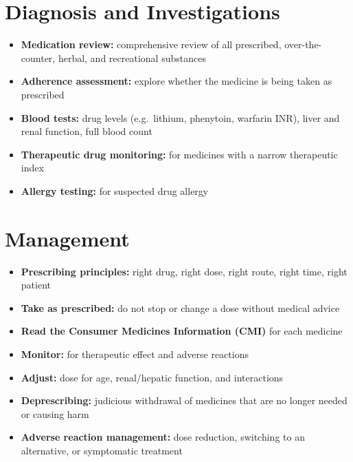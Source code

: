 \section*{Diagnosis and Investigations}
\begin{itemize}
    \item \textbf{Medication review:} comprehensive review of all prescribed, over-the-counter, herbal, and recreational substances
    \item \textbf{Adherence assessment:} explore whether the medicine is being taken as prescribed
    \item \textbf{Blood tests:} drug levels (e.g.\ lithium, phenytoin, warfarin INR), liver and renal function, full blood count
    \item \textbf{Therapeutic drug monitoring:} for medicines with a narrow therapeutic index
    \item \textbf{Allergy testing:} for suspected drug allergy
\end{itemize}

\section*{Management}
\begin{itemize}
    \item \textbf{Prescribing principles:} right drug, right dose, right route, right time, right patient
    \item \textbf{Take as prescribed:} do not stop or change a dose without medical advice
    \item \textbf{Read the Consumer Medicines Information (CMI)} for each medicine
    \item \textbf{Monitor:} for therapeutic effect and adverse reactions
    \item \textbf{Adjust:} dose for age, renal/hepatic function, and interactions
    \item \textbf{Deprescribing:} judicious withdrawal of medicines that are no longer needed or causing harm
    \item \textbf{Adverse reaction management:} dose reduction, switching to an alternative, or symptomatic treatment
\end{itemize}

